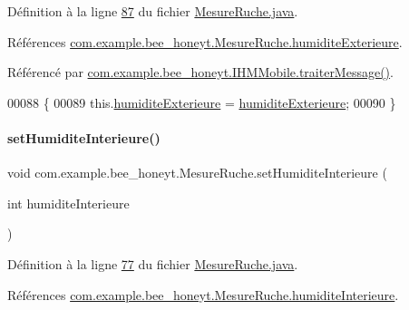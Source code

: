 Définition à la ligne \hyperlink{_mesure_ruche_8java_source_l00087}{87} du fichier \hyperlink{_mesure_ruche_8java_source}{Mesure\+Ruche.\+java}.



Références \hyperlink{_mesure_ruche_8java_source_l00020}{com.\+example.\+bee\+\_\+honeyt.\+Mesure\+Ruche.\+humidite\+Exterieure}.



Référencé par \hyperlink{_i_h_m_mobile_8java_source_l00374}{com.\+example.\+bee\+\_\+honeyt.\+I\+H\+M\+Mobile.\+traiter\+Message()}.


\begin{DoxyCode}
00088     \{
00089         this.\hyperlink{classcom_1_1example_1_1bee__honeyt_1_1_mesure_ruche_aa5521e97dfa98051bff9fd8d3ca3f34d}{humiditeExterieure} = \hyperlink{classcom_1_1example_1_1bee__honeyt_1_1_mesure_ruche_aa5521e97dfa98051bff9fd8d3ca3f34d}{humiditeExterieure};
00090     \}
\end{DoxyCode}
\mbox{\label{classcom_1_1example_1_1bee__honeyt_1_1_mesure_ruche_a8f2d166ffd8340562d9e5cbe5ea5f907}} 
\paragraph{\texorpdfstring{set\+Humidite\+Interieure()}{setHumiditeInterieure()}}
{\footnotesize\ttfamily void com.\+example.\+bee\+\_\+honeyt.\+Mesure\+Ruche.\+set\+Humidite\+Interieure (\begin{DoxyParamCaption}\item[{int}]{humidite\+Interieure }\end{DoxyParamCaption})}



Définition à la ligne \hyperlink{_mesure_ruche_8java_source_l00077}{77} du fichier \hyperlink{_mesure_ruche_8java_source}{Mesure\+Ruche.\+java}.



Références \hyperlink{_mesure_ruche_8java_source_l00019}{com.\+example.\+bee\+\_\+honeyt.\+Mesure\+Ruche.\+humidite\+Interieure}.



